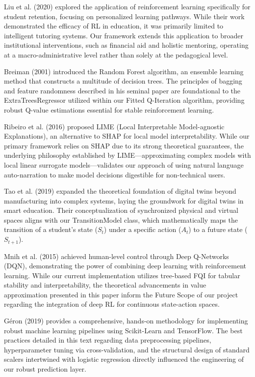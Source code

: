 \documentclass[12pt,a4paper]{report}
\begin{document}
Liu et al. (2020) \cite{liu2020} explored the application of reinforcement learning specifically for student retention, focusing on personalized learning pathways. While their work demonstrated the efficacy of RL in education, it was primarily limited to intelligent tutoring systems. Our framework extends this application to broader institutional interventions, such as financial aid and holistic mentoring, operating at a macro-administrative level rather than solely at the pedagogical level.

Breiman (2001) \cite{breiman2001} introduced the Random Forest algorithm, an ensemble learning method that constructs a multitude of decision trees. The principles of bagging and feature randomness described in his seminal paper are foundational to the ExtraTreesRegressor utilized within our Fitted Q-Iteration algorithm, providing robust Q-value estimations essential for stable reinforcement learning.

Ribeiro et al. (2016) \cite{ribeiro2016} proposed LIME (Local Interpretable Model-agnostic Explanations), an alternative to SHAP for local model interpretability. While our primary framework relies on SHAP due to its strong theoretical guarantees, the underlying philosophy established by LIME—approximating complex models with local linear surrogate models—validates our approach of using natural language auto-narration to make model decisions digestible for non-technical users.

Tao et al. (2019) \cite{tao2019} expanded the theoretical foundation of digital twins beyond manufacturing into complex systems, laying the groundwork for digital twins in smart education. Their conceptualization of synchronized physical and virtual spaces aligns with our TransitionModel class, which mathematically maps the transition of a student's state ($S_t$) under a specific action ($A_t$) to a future state ($S_{t+1}$).

Mnih et al. (2015) \cite{mnih2015} achieved human-level control through Deep Q-Networks (DQN), demonstrating the power of combining deep learning with reinforcement learning. While our current implementation utilizes tree-based FQI for tabular stability and interpretability, the theoretical advancements in value approximation presented in this paper inform the Future Scope of our project regarding the integration of deep RL for continuous state-action spaces.

Géron (2019) \cite{geron2019} provides a comprehensive, hands-on methodology for implementing robust machine learning pipelines using Scikit-Learn and TensorFlow. The best practices detailed in this text regarding data preprocessing pipelines, hyperparameter tuning via cross-validation, and the structural design of standard scalers intertwined with logistic regression directly influenced the engineering of our robust prediction layer.
\end{document}
